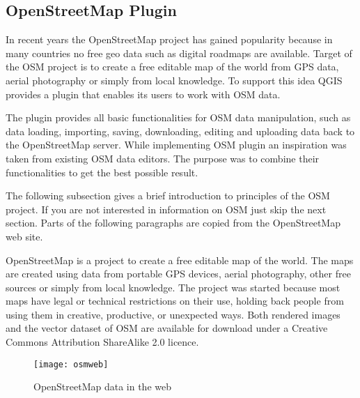 
\subsection{OpenStreetMap Plugin}


In recent years the OpenStreetMap project has gained popularity because in 
many countries no free geo data such as digital roadmaps are available. 
Target of the OSM project is to create a free editable map of the world 
from GPS data, aerial photography or simply from local knowledge. To 
support this idea QGIS provides a plugin that enables its users to work
with OSM data.

The plugin provides all basic functionalities for OSM data manipulation, 
such as data loading, importing, saving, downloading, editing and 
uploading data back to the OpenStreetMap server. While implementing OSM 
plugin an inspiration was taken from existing OSM data editors. The 
purpose was to combine their functionalities to get the best
possible result.

The following subsection gives a brief introduction to principles of the OSM 
project. If you are not interested in information on OSM just skip the next 
section. Parts of the following paragraphs are copied from the 
OpenStreetMap web site.


OpenStreetMap is a project to create a free editable map of the world. The
maps are created using data from portable GPS devices, aerial photography,
other free sources or simply from local knowledge. The project was started
because most maps have legal or technical restrictions on their use, holding
back people from using them in creative, productive, or unexpected ways. Both
rendered images and the vector dataset of OSM are available for download
under a Creative Commons Attribution ShareAlike 2.0 licence.

\begin{figure}[ht]
   \begin{center}
   \caption{OpenStreetMap data in the web \nixcaption}\label{fig:osmweb}\smallskip
   \texttt{[image: osmweb]}
\end{center}
\end{figure}

